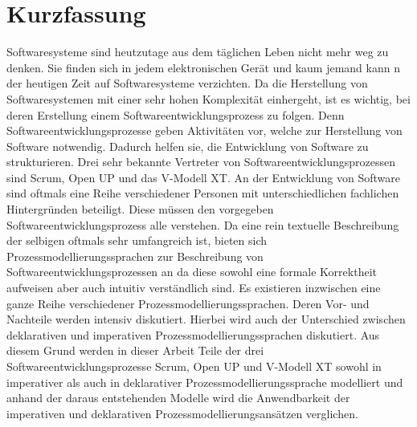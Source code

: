 \section*{Kurzfassung}

Softwaresysteme sind heutzutage aus dem täglichen Leben nicht mehr weg zu denken. Sie finden sich in jedem elektronischen Gerät und kaum jemand kann n der heutigen Zeit auf Softwaresysteme verzichten. Da die Herstellung von Softwaresystemen mit einer sehr hohen Komplexität einhergeht, ist es wichtig, 
bei deren Erstellung einem Softwareentwicklungsprozess zu folgen. Denn Softwareentwicklungsprozesse geben Aktivitäten vor, welche zur Herstellung von Software notwendig. Dadurch helfen sie, die Entwicklung von Software zu strukturieren. Drei sehr bekannte Vertreter von Softwareentwicklungsprozessen sind Scrum, Open UP und das V-Modell XT.\newline
An der Entwicklung von Software sind oftmals eine Reihe verschiedener Personen mit unterschiedlichen fachlichen Hintergründen beteiligt. Diese müssen den vorgegeben Softwareentwicklungsprozess alle verstehen. Da eine rein textuelle Beschreibung der selbigen oftmals sehr umfangreich ist, bieten sich Prozessmodellierungssprachen zur Beschreibung von Softwareentwicklungsprozessen an da diese sowohl eine formale Korrektheit aufweisen aber auch intuitiv verständlich sind.\newline
Es existieren inzwischen eine ganze Reihe verschiedener Prozessmodellierungssprachen. Deren Vor- und Nachteile werden intensiv diskutiert. Hierbei wird auch der Unterschied zwischen deklarativen und imperativen Prozessmodellierungssprachen diskutiert.\newline
Aus diesem Grund werden in dieser Arbeit Teile der drei Softwareentwicklungsprozesse Scrum, Open UP und V-Modell XT sowohl in imperativer als auch in deklarativer Prozessmodellierungssprache modelliert und anhand der daraus entstehenden Modelle wird die Anwendbarkeit der imperativen und deklarativen Prozessmodellierungsansätzen verglichen.



